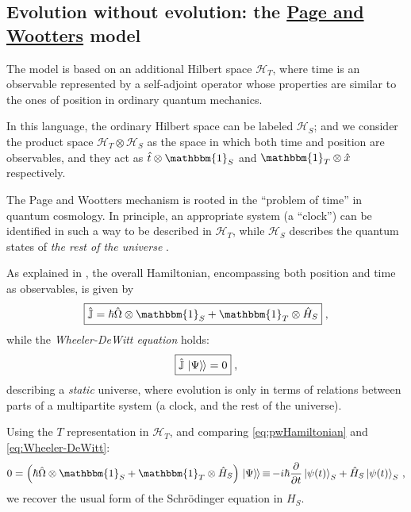 \documentclass[a0,portrait]{a0poster}
\newcommand{\term}[1]{\emph{#1}}
\newcommand{\idop}{\mathbbm{1}}           %
\newcommand{\hilb}[1]{\mathcal{#1}}       %
\newcommand{\ox}{\otimes}
\DeclareMathOperator*{\repr}{\equiv}      %
\newcommand{\smallback}{\hspace{-0.115em}}
\newcommand{\dket}[1]{\left.\left| #1 \right\rangle\smallback\right\rangle}
\begin{document}
\begin{multicols}{2}

\color{maincolor} %

\section*{Evolution without evolution: the \underline{Page and Wootters} model}

The model \cite{Lloyd:Time, Maccone:Pauli} is based on
an additional Hilbert space $\mathcal{H}_T$,
where time is an observable
represented by a self-adjoint operator
whose properties are similar to the ones of position
in ordinary quantum mechanics.

In this language, the ordinary Hilbert space can be labeled $\mathcal{H}_S$;
and we consider the product space $\mathcal{H}_T \otimes \mathcal{H}_S$ as
the space in which both time and position are observables, and they act as
$\hat{t} \otimes \idop_S$ and $\idop_T \otimes \hat{x}$
respectively.

The Page and Wootters mechanism is rooted in the ``problem of time''
in quantum cosmology.
In principle, an appropriate system (a ``clock'') can be identified in such a way
to be described in $\mathcal{H}_T$, while $\mathcal{H}_S$ describes
the quantum states of \emph{the rest of the universe} \cite{Marletto:Evolution}.

As explained in \cite{Lloyd:Time, Maccone:Pauli}, the overall Hamiltonian,
encompassing both position and time as observables, is given by
\begin{equation}\label{eq:pwHamiltonian}
    \boxed{\hat{\mathbb{J}} = \hbar\hat{\Omega}\ox\idop_S + \idop_T\ox\hat{H}_S}
    \;\text{,}
\end{equation}
while the \term{Wheeler-DeWitt equation} holds:
\begin{equation}\label{eq:Wheeler-DeWitt}
  \boxed{\hat{\mathbb{J}}\dket{\Psi} = 0}
  \;\text{,}
\end{equation}
describing a \emph{static} universe, where evolution is only
in terms of relations between parts of a multipartite system
(a clock, and the rest of the universe).

Using the $T$ representation in $\hilb{H}_T$,
and comparing \eqref{eq:pwHamiltonian} and \eqref{eq:Wheeler-DeWitt}:
\begin{equation}\label{eq:schrod_from_pw}
  0 = \qty(\hbar\hat{\Omega}\ox\idop_S + \idop_{T}\ox\hat{H}_S)\dket{\Psi}
    \repr -i\hbar\pdv{t}\ket{\psi(t)}_{S} + \hat{H}_S\ket{\psi(t)}_{S}
    \,\text{,}
\end{equation}
we recover the usual form of the Schr\"{o}dinger equation in $H_S$.


\end{multicols}
\end{document}
